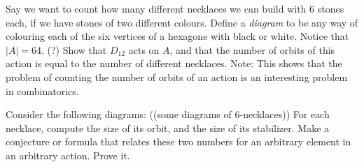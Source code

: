 \documentclass[1    0pt, answers]{exam} \renewcommand{\baselinestretch}{1.05}
\theoremstyle{plain}
\theoremstyle{definition}
\begin{document}
\begin{questions}

\question Say we want to count how many different necklaces we can build with 6 stones each, if we have stones of two different colours. Define a \emph{diagram} to be any way of colouring each of the six vertices of a hexagone with black or white. Notice that $|A| = 64$. (?) Show that $D_{12}$ acts on $A$, and that the number of orbits of this action is equal to the number of different necklaces.
Note: This shows that the problem of counting the number of orbits of an action is an interesting problem in combinatorics.

\question Consider the following diagrams: ((some diagrams of 6-necklaces))
For each necklace, compute the size of its orbit, and the size of its stabilizer. Make a conjecture or formula that relates these two numbers for an arbitrary element in an arbitrary action. Prove it.
\end{questions}
\end{document}
